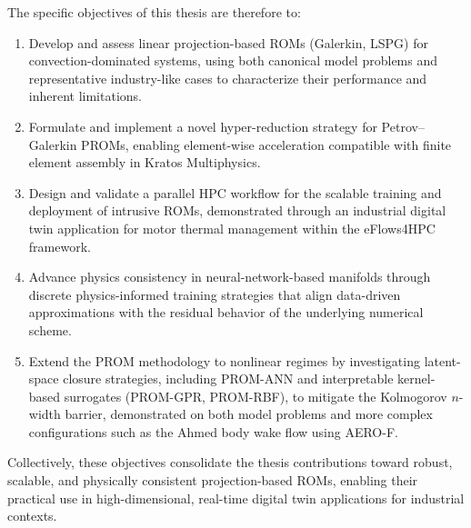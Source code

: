 The specific objectives of this thesis are therefore to:
\begin{enumerate}
    \item Develop and assess linear projection-based ROMs (Galerkin, LSPG) for convection-dominated systems, using both canonical model problems and representative industry-like cases to characterize their performance and inherent limitations.
    \item Formulate and implement a novel hyper-reduction strategy for Petrov–Galerkin PROMs, enabling element-wise acceleration compatible with finite element assembly in Kratos Multiphysics.
    \item Design and validate a parallel HPC workflow for the scalable training and deployment of intrusive ROMs, demonstrated through an industrial digital twin application for motor thermal management within the eFlows4HPC framework.
    \item Advance physics consistency in neural-network-based manifolds through discrete physics-informed training strategies that align data-driven approximations with the residual behavior of the underlying numerical scheme.
    \item Extend the PROM methodology to nonlinear regimes by investigating latent-space closure strategies, including PROM-ANN and interpretable kernel-based surrogates (PROM-GPR, PROM-RBF), to mitigate the Kolmogorov $n$-width barrier, demonstrated on both model problems and more complex configurations such as the Ahmed body wake flow using AERO-F.
\end{enumerate}

Collectively, these objectives consolidate the thesis contributions toward robust, scalable, and physically consistent projection-based ROMs, enabling their practical use in high-dimensional, real-time digital twin applications for industrial contexts.



